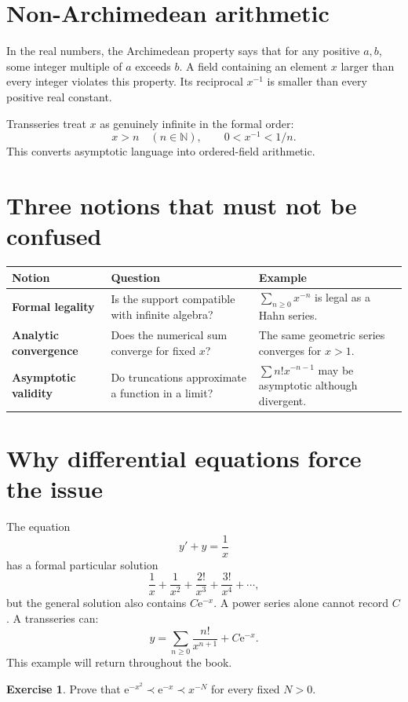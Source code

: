 \documentclass[11pt,oneside,openany]{book}
\newcommand{\N}{\mathbb{N}}
\newcommand{\e}{\mathrm{e}}
\theoremstyle{plain}
\theoremstyle{definition}
\newtheorem{exercise}{Exercise}[chapter]
\theoremstyle{remark}
\begin{document}
\section{Non-Archimedean arithmetic}
In the real numbers, the Archimedean property says that for any positive $a,b$, some integer multiple of $a$ exceeds $b$. A field containing an element $x$ larger than every integer violates this property. Its reciprocal $x^{-1}$ is smaller than every positive real constant.

Transseries treat $x$ as genuinely infinite in the formal order:
\[
  x>n\quad(n\in\N),
  \qquad0<x^{-1}<1/n.
\]
This converts asymptotic language into ordered-field arithmetic.

\section{Three notions that must not be confused}
\begin{center}
\begin{tabularx}{0.94\textwidth}{>{\bfseries}p{}XX}
\toprule
Notion & Question & Example\\
\midrule
Formal legality & Is the support compatible with infinite algebra? & $\sum_{n\ge0}x^{-n}$ is legal as a Hahn series.\\
Analytic convergence & Does the numerical sum converge for fixed $x$? & The same geometric series converges for $x>1$.\\
Asymptotic validity & Do truncations approximate a function in a limit? & $\sum n!x^{-n-1}$ may be asymptotic although divergent.\\
\bottomrule
\end{tabularx}
\end{center}

\section{Why differential equations force the issue}
The equation
\[
  y'+y=\frac1x
\]
has a formal particular solution
\[
  \frac1x+\frac1{x^2}+\frac{2!}{x^3}+\frac{3!}{x^4}+\cdots,
\]
but the general solution also contains $C\e^{-x}$. A power series alone cannot record $C$. A transseries can:
\[
  y=\sum_{n\ge0}\frac{n!}{x^{n+1}}+C\e^{-x}.
\]
This example will return throughout the book.

\begin{exercise}
Prove that $\e^{-x^2}\prec\e^{-x}\prec x^{-N}$ for every fixed $N>0$.
\end{exercise}
\end{document}
